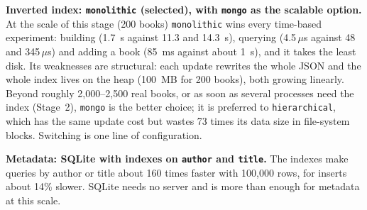 \documentclass[11pt,a4paper]{article}
\newcommand{\code}[1]{\texttt{#1}}
\newcommand{\us}{\,$\mu$s}
\begin{document}
\textbf{Inverted index: \code{monolithic} (selected), with \code{mongo} as the scalable option.} At
the scale of this stage (200 books) \code{monolithic} wins every time-based experiment: building
(1.7~s against 11.3 and 14.3~s), querying (4.5\us{} against 48 and 345\us) and adding a book (85~ms
against about 1~s), and it takes the least disk. Its weaknesses are structural: each update
rewrites the whole JSON and the whole index lives on the heap (100~MB for 200 books), both growing
linearly. Beyond roughly 2,000--2,500 real books, or as soon as several processes need the index
(Stage~2), \code{mongo} is the better choice; it is preferred to \code{hierarchical}, which has the
same update cost but wastes 73 times its data size in file-system blocks. Switching is one line of
configuration.

\textbf{Metadata: SQLite with indexes on \code{author} and \code{title}.} The indexes make queries by
author or title about 160 times faster with 100,000 rows, for inserts about 14\% slower. SQLite needs
no server and is more than enough for metadata at this scale.
\end{document}
